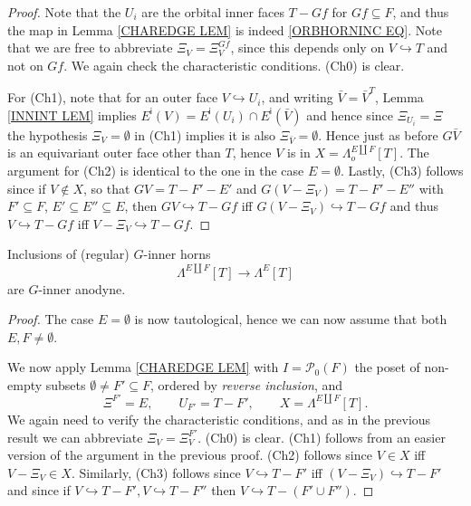 \documentclass[a4paper,10pt,draft]{article}%
\begin{document}
\begin{proof}
Note that the $U_i$ are the orbital inner faces $T - Gf$ for $Gf \subseteq F$, and thus the map
in Lemma \ref{CHAREDGE LEM} is indeed \eqref{ORBHORNINC EQ}.
Note that we are free to abbreviate $\Xi_V = \Xi^{Gf}_V$, since this
depends only on $V \hookrightarrow T$ and not on $Gf$.
We again check the characteristic conditions. (Ch0) is clear.

	For (Ch1), note that for an outer face 
	$V \hookrightarrow U_i$, and writing $\bar{V} = \bar{V}^T$,
	Lemma \ref{INNINT LEM} implies
	$E^{\mathsf{i}}(V) = E^{\mathsf{i}}(U_i) \cap E^{\mathsf{i}}(\bar{V})$
	and hence since $\Xi_{U_i}=\Xi$ the 
	hypothesis $\Xi_{V} = \emptyset$ in (Ch1) implies it is also
	$\Xi_{\bar{V}} = \emptyset$.
	Hence just as before $G\bar{V}$ is an equivariant outer face other than $T$, hence $V$ is in $X=\Lambda_o^{E\amalg F}[T]$.
	The argument for (Ch2) is identical to the one in the case
	$E=\emptyset$.
	Lastly, (Ch3) follows since	if $V \not \in X$, so that
	$GV = T - F'-E'$ and $G(V - \Xi_V) = T-F'-E''$ with
	$F' \subseteq F$, $E' \subseteq E'' \subseteq E$,
	then $GV \hookrightarrow T-Gf$ iff $G(V - \Xi_V) \hookrightarrow T-Gf$
	and thus $V \hookrightarrow T-Gf$ iff $V - \Xi_V \hookrightarrow T-Gf$.
\end{proof}

\begin{proposition} Inclusions of (regular) $G$-inner horns
\begin{equation}
	\Lambda^{E \amalg F}[T] \to \Lambda^{E}[T]
\end{equation}
are $G$-inner anodyne.
\end{proposition}

\begin{proof}
The case $E = \emptyset$ is now tautological,
hence we can now assume that both $E,F \neq \emptyset$.

We now apply Lemma \ref{CHAREDGE LEM} with 
$I = \mathcal{P}_0(F)$
the poset of non-empty subsets $\emptyset \neq F' \subseteq F$, ordered by \textit{reverse inclusion}, and
\[
	\Xi^{F'} = E, \qquad
	U_{F'} = T - F', \qquad
	X=\Lambda^{E\amalg F}[T].
\]
We again need to verify the characteristic conditions,
and as in the previous result we can abbreviate
$\Xi_V = \Xi^{F'}_V$.
(Ch0) is clear. (Ch1) follows from an easier version of the argument in the previous proof.
(Ch2) follows since $V \in X$ iff $V-\Xi_V \in X$.
Similarly,
(Ch3) follows since 
$V \hookrightarrow T-F'$ iff $(V-\Xi_V) \hookrightarrow T-F'$
and since if
$V \hookrightarrow T-F',V \hookrightarrow T-F''$
then 
$V \hookrightarrow T-(F' \cup F'')$.
\end{proof}
\end{document}
